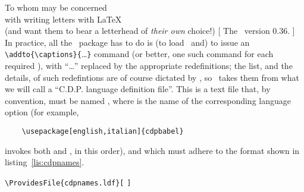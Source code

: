\begin{letterhead}{
	To whom may be concerned\\
	with writing letters with \LaTeX\\
	(and want them to bear a letterhead
	of \emph{their own} choice!)
}[
	The \Bundle\ version 0.36.
]
In practice, all the \cdpbabel\ package has to do is (to load \babel\ and) to
issue an \verb|\addto{\captions|\verb|}{|\ldots\verb|}| command
(or better, one such command for each required ), with ``\ldots''
replaced by the appropriate redefinitions; the list, and the details, of such
redefintions are of course dictated by , so \cdpbabel\ takes them
from what we will call a ``C.D.P. language definition file''.  This is a text
file that, by convention, must be named
, where  is the
name of the corresponding language option (for example,
%
\begin{verbatim}
	\usepackage[english,italian]{cdpbabel}
\end{verbatim}
%
invokes both  and , in
this order), and which must adhere to the format shown in
listing~\ref{lis:cdpnames}.

\begin{listing}[tbp]
	\cleantop
	\zerolistvertspaces
	\begin{flushleft}
		\verb|\ProvidesFile{cdpnames|\verb|.ldf}[|%
				\verb|]|
	\end{flushleft}
\begin{verbatim}


\end{verbatim}
\end{listing}
\end{letterhead}
